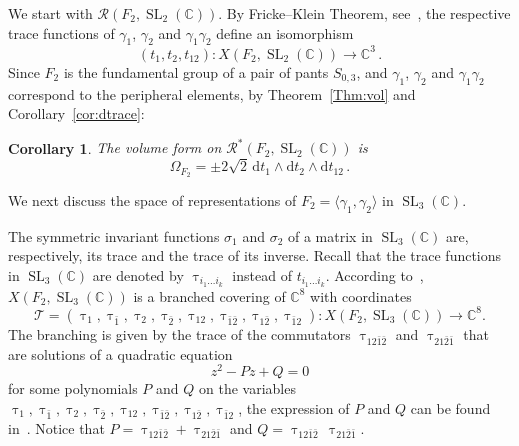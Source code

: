\documentclass[11pt]{article}
\newtheorem{coro}[theo]{Corollary}
\theoremstyle{definition}
\numberwithin{equation}{section}
\numberwithin{figure}{section}
\numberwithin{table}{section}
\DeclareMathOperator{\SL}{SL}
\newcommand{\Rcal}{\mathcal{R}}
\newcommand{\Tcal}{\mathcal{T}}
\newcommand{\Cbb}{\mathbb{C}}
\newcommand*{\dd}{\mathrm{d}}
\begin{document}
We start with $\Rcal(F_2,\SL_2(\Cbb))$. By Fricke--Klein Theorem, see~\cite{Goldman09}, the respective trace functions of $\gamma_1$, $\gamma_2$ and $\gamma_{1}\gamma_2$ define an isomorphism
\begin{equation}\label{eqn:Fricke}
(t_1,t_2,t_{12})\colon X(F_2,\SL_2(\Cbb))\to \Cbb^3\,.
\end{equation}
Since $F_2$ is the fundamental group of a pair of pants $S_{0,3} $, and $\gamma_1$, $\gamma_2$ and $\gamma_{1}\gamma_2$ correspond to the peripheral elements, by Theorem~\ref{Thm:vol} and Corollary~\ref{cor:dtrace}:

\begin{coro}\label{cor:C3}
The volume form on $\Rcal^*(F_2,\SL_2(\Cbb))$ is
\[
\Omega_{ F_2}= \pm 2\sqrt{2}\, \dd t_1 \wedge \dd t_2 \wedge \dd t_{12}\,.
\]
\end{coro}


We next discuss the space of representations of $F_2=\langle \gamma_1,\gamma_2\rangle$ in $\SL_3(\Cbb)$.



The symmetric invariant functions $\sigma_1$ and $\sigma_2$ of a matrix in $\SL_3(\Cbb)$ are, respectively, its trace and the trace of its inverse. Recall that the trace functions in $\SL_3(\Cbb)$ are denoted by $\uptau_{i_1\dots i_k}$ instead of $t_{i_1\dots i_k}$. According to~\cite{LawtonJA}, $X(F_2,\SL_3(\Cbb))$ is a branched covering of $\Cbb^8$ with coordinates
\[
\Tcal=(\uptau_1,\uptau_{\bar 1},\uptau_2,\uptau_{\bar 2},\uptau_{12},\uptau_{\bar 1\bar 2},\uptau_{1\bar 2}, \uptau_{\bar 12})
\colon X(F_2, \SL_3(\Cbb))\to \Cbb^8.
\]
The branching is given by the trace of the commutators $\uptau_{12\bar1\bar2}$ and $\uptau_{21\bar 2\bar 1}$ that are solutions of a quadratic equation
\[
z^2 - P z + Q = 0
\]
for some polynomials $P$ and $Q$ on the variables $\uptau_1,\uptau_{\bar 1},\uptau_2,\uptau_{\bar 2},\uptau_{12},\uptau_{\bar 1\bar 2},\uptau_{1\bar 2}, \uptau_{\bar 12}$, the expression of $P$ and $Q$ can be found in~\cite{LawtonJA,LawtonP}. Notice that $P= \uptau_ {12\bar1\bar2} + \uptau_{21\bar 2\bar 1}$ and $Q = \uptau_ {12\bar1\bar2} \, \uptau_{21\bar 2\bar 1}$.
\end{document}
